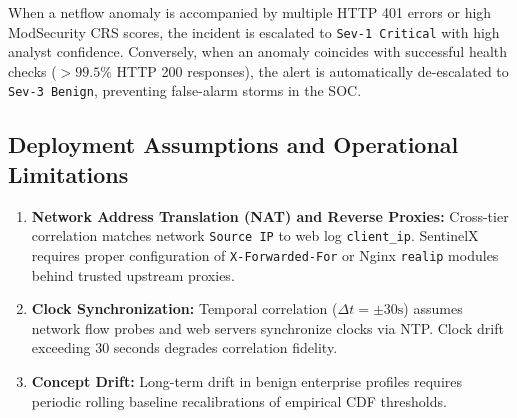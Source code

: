 \documentclass[conference,10pt,twocolumn]{IEEEtran}
\begin{document}
\begin{table}[!t]
\centering
\caption{Multi-Tier Guardrail Policy Decision Matrix}
\label{tab:guardrail_matrix}
\setlength{\tabcolsep}{3pt}
\end{table}

When a netflow anomaly is accompanied by multiple HTTP 401 errors or high ModSecurity CRS scores, the incident is escalated to \texttt{Sev-1 Critical} with high analyst confidence. Conversely, when an anomaly coincides with successful health checks ($>99.5\%$ HTTP 200 responses), the alert is automatically de-escalated to \texttt{Sev-3 Benign}, preventing false-alarm storms in the SOC.

\subsection{Deployment Assumptions and Operational Limitations}
\begin{enumerate}
    \item \textbf{Network Address Translation (NAT) and Reverse Proxies:} Cross-tier correlation matches network \texttt{Source IP} to web log \texttt{client\_ip}. SentinelX requires proper configuration of \texttt{X-Forwarded-For} or Nginx \texttt{realip} modules behind trusted upstream proxies.
    \item \textbf{Clock Synchronization:} Temporal correlation ($\Delta t = \pm 30\text{s}$) assumes network flow probes and web servers synchronize clocks via NTP. Clock drift exceeding 30 seconds degrades correlation fidelity.
    \item \textbf{Concept Drift:} Long-term drift in benign enterprise profiles requires periodic rolling baseline recalibrations of empirical CDF thresholds.
\end{enumerate}
\end{document}
